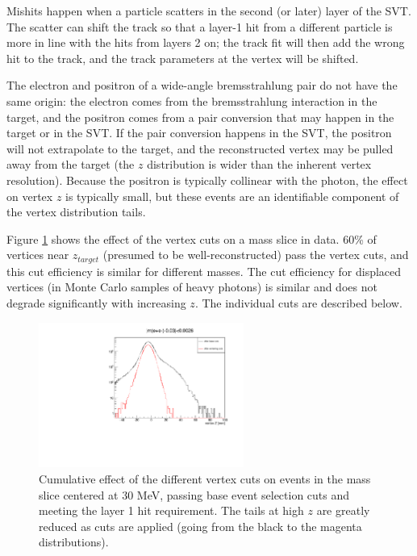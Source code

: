 Mishits happen when a particle scatters in the second (or later) layer of the SVT.
The scatter can shift the track so that a layer-1 hit from a different particle is more in line with the hits from layers 2 on; the track fit will then add the wrong hit to the track, and the track parameters at the vertex will be shifted.

The electron and positron of a wide-angle bremsstrahlung pair do not have the same origin: the electron comes from the bremsstrahlung interaction in the target, and the positron comes from a pair conversion that may happen in the target or in the SVT.
If the pair conversion happens in the SVT, the positron will not extrapolate to the target, and the reconstructed vertex may be pulled away from the target (the $z$ distribution is wider than the inherent vertex resolution).
Because the positron is typically collinear with the photon, the effect on vertex $z$ is typically small, but these events are an identifiable component of the vertex distribution tails.

Figure \ref{fig:vertcut_performance} shows the effect of the vertex cuts on a mass slice in data. 60\% of vertices near $z_{target}$ (presumed to be well-reconstructed) pass the vertex cuts, and this cut efficiency is similar for different masses.
The cut efficiency for displaced vertices (in Monte Carlo samples of heavy photons) is similar and does not degrade significantly with increasing $z$.
The individual cuts are described below.

\begin{figure}[ht]
\begin{center}
    \includegraphics[width=0.6\textwidth,page=2,angle=-90]{vertexing/figs/vertcutplots}
\end{center}
    \caption{Cumulative effect of the different vertex cuts on events in the mass slice centered at 30 MeV, passing base event selection cuts and meeting the layer 1 hit requirement.
    The tails at high $z$ are greatly reduced as cuts are applied (going from the black to the magenta distributions).
    }
    \label{fig:vertcut_performance}
\end{figure}

